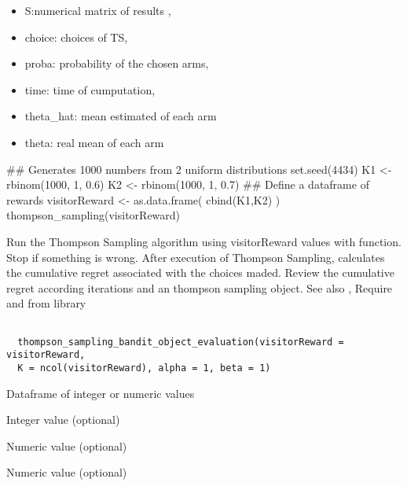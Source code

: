 \documentclass[letterpaper]{book}
\begin{document}
%
\begin{Value}
\begin{itemize}
 List of element:
\item S:numerical matrix of results ,
\item choice: choices of TS,
\item proba: probability of the chosen arms,
\item time: time of cumputation,
\item theta\_hat: mean estimated of each arm
\item theta: real mean of each arm

\end{itemize}

\end{Value}
%
\begin{Examples}
\begin{ExampleCode}
## Generates 1000 numbers from 2 uniform distributions
set.seed(4434)
K1 <- rbinom(1000, 1, 0.6)
K2 <- rbinom(1000, 1, 0.7)
## Define a dataframe of rewards
visitorReward <- as.data.frame( cbind(K1,K2) )
thompson_sampling(visitorReward)
\end{ExampleCode}
\end{Examples}
%
\begin{Description}\relax
Run the Thompson Sampling algorithm using visitorReward values with  function.
Stop if something is wrong.
After execution of Thompson Sampling, calculates the cumulative regret
associated with the choices maded.
Review the cumulative regret according iterations and an thompson sampling object.
See also , 
Require  and  from  library
\end{Description}
%
\begin{Usage}
\begin{verbatim}

  thompson_sampling_bandit_object_evaluation(visitorReward = visitorReward,
  K = ncol(visitorReward), alpha = 1, beta = 1)
\end{verbatim}
\end{Usage}
%
\begin{Arguments}
\begin{ldescription}
\item[\code{visitorReward}] Dataframe of integer or numeric values

\item[\code{K}] Integer value (optional)

\item[\code{alpha}] Numeric value (optional)

\item[\code{beta}] Numeric value (optional)
\end{ldescription}
\end{Arguments}
\end{document}
